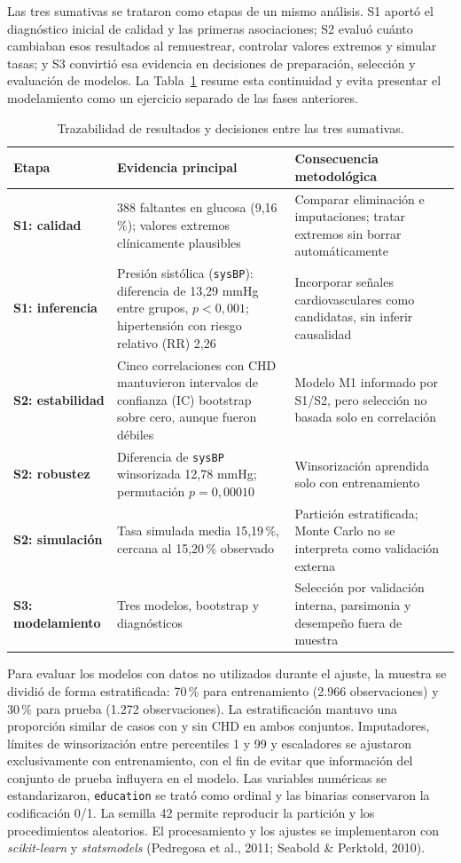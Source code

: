 \documentclass[10pt,a4paper]{article}
\newcommand{\compacttable}{\small\renewcommand{\arraystretch}{1.12}}
\begin{document}
Las tres sumativas se trataron como etapas de un mismo análisis. S1 aportó el diagnóstico inicial de calidad y las primeras asociaciones; S2 evaluó cuánto cambiaban esos resultados al remuestrear, controlar valores extremos y simular tasas; y S3 convirtió esa evidencia en decisiones de preparación, selección y evaluación de modelos. La Tabla~\ref{tab:trazabilidad} resume esta continuidad y evita presentar el modelamiento como un ejercicio separado de las fases anteriores.

\begin{table}[htbp]
\centering
\caption{Trazabilidad de resultados y decisiones entre las tres sumativas.}
\label{tab:trazabilidad}
\compacttable
\begin{tabularx}{\textwidth}{>{\bfseries}p{2.35cm} X X}
\toprule
Etapa & Evidencia principal & Consecuencia metodológica \\
\midrule
S1: calidad & 388 faltantes en glucosa (9,16\,\%); valores extremos clínicamente plausibles & Comparar eliminación e imputaciones; tratar extremos sin borrar automáticamente \\
S1: inferencia & Presión sistólica (\texttt{sysBP}): diferencia de 13,29 mmHg entre grupos, $p<0{,}001$; hipertensión con riesgo relativo (RR) 2,26 & Incorporar señales cardiovasculares como candidatas, sin inferir causalidad \\
S2: estabilidad & Cinco correlaciones con CHD mantuvieron intervalos de confianza (IC) bootstrap sobre cero, aunque fueron débiles & Modelo M1 informado por S1/S2, pero selección no basada solo en correlación \\
S2: robustez & Diferencia de \texttt{sysBP} winsorizada 12,78 mmHg; permutación $p=0{,}00010$ & Winsorización aprendida solo con entrenamiento \\
S2: simulación & Tasa simulada media 15,19\,\%, cercana al 15,20\,\% observado & Partición estratificada; Monte Carlo no se interpreta como validación externa \\
S3: modelamiento & Tres modelos, bootstrap y diagnósticos & Selección por validación interna, parsimonia y desempeño fuera de muestra \\
\bottomrule
\end{tabularx}
\end{table}

Para evaluar los modelos con datos no utilizados durante el ajuste, la muestra se dividió de forma estratificada: 70\,\% para entrenamiento (2.966 observaciones) y 30\,\% para prueba (1.272 observaciones). La estratificación mantuvo una proporción similar de casos con y sin CHD en ambos conjuntos. Imputadores, límites de winsorización entre percentiles 1 y 99 y escaladores se ajustaron exclusivamente con entrenamiento, con el fin de evitar que información del conjunto de prueba influyera en el modelo. Las variables numéricas se estandarizaron, \texttt{education} se trató como ordinal y las binarias conservaron la codificación 0/1. La semilla 42 permite reproducir la partición y los procedimientos aleatorios. El procesamiento y los ajustes se implementaron con \textit{scikit-learn} y \textit{statsmodels} (Pedregosa et al., 2011; Seabold \& Perktold, 2010).
\end{document}
